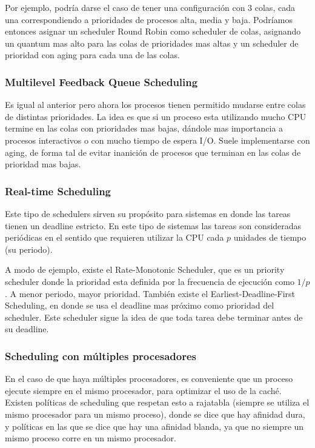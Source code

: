 \documentclass{article}
\begin{document}
Por ejemplo, podría darse el caso de tener una configuración con 3 colas, cada una correspondiendo a prioridades de procesos alta, media y baja. Podríamos entonces asignar un scheduler Round Robin como scheduler de colas, asignando un quantum mas alto para las colas de prioridades mas altas y un scheduler de prioridad con aging para cada una de las colas.

\subsubsection{Multilevel Feedback Queue Scheduling}
Es igual al anterior pero ahora los procesos tienen permitido mudarse entre colas de distintas prioridades. La idea es que si un proceso esta utilizando mucho CPU termine en las colas con prioridades mas bajas, dándole mas importancia a procesos interactivos o con mucho tiempo de espera I/O. Suele implementarse con aging, de forma tal de evitar inanición de procesos que terminan en las colas de prioridad mas bajas.

\subsubsection{Real-time Scheduling}
Este tipo de schedulers sirven su propósito para sistemas en donde las tareas tienen un deadline estricto. En este tipo de sistemas las tareas son consideradas periódicas en el sentido que requieren utilizar la CPU cada $p$ unidades de tiempo (su periodo).

A modo de ejemplo, existe el Rate-Monotonic Scheduler, que es un priority scheduler donde la prioridad esta definida por la frecuencia de ejecución como $1/p$. A menor periodo, mayor prioridad. También existe el Earliest-Deadline-First Scheduling, en donde se usa el deadline mas próximo como prioridad del scheduler. Este scheduler sigue la idea de que toda tarea debe terminar antes de su deadline.

\subsubsection{Scheduling con m\'ultiples procesadores}

En el caso de que haya m\'ultiples procesadores, es conveniente que un proceso ejecute siempre en el mismo procesador, para optimizar el uso de la cach\'e. Existen pol\'iticas de scheduling que respetan esto a rajatabla (siempre se utiliza el mismo procesador para un mismo proceso), donde se dice que hay afinidad dura, y pol\'iticas en las que se dice que hay una afinidad blanda, ya que no siempre un mismo proceso corre en un mismo procesador.
\end{document}
